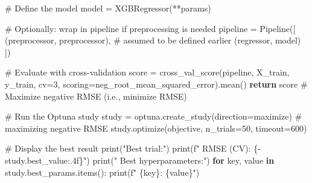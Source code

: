 \documentclass[
  letterpaper,
  DIV=11,
  numbers=noendperiod]{scrreprt}
\newenvironment{Shaded}{\begin{snugshade}}{\end{snugshade}}
\newcommand{\BuiltInTok}[1]{\textcolor[rgb]{0.00,0.23,0.31}{#1}}
\newcommand{\CommentTok}[1]{\textcolor[rgb]{0.37,0.37,0.37}{#1}}
\newcommand{\ControlFlowTok}[1]{\textcolor[rgb]{0.00,0.23,0.31}{\textbf{#1}}}
\newcommand{\DecValTok}[1]{\textcolor[rgb]{0.68,0.00,0.00}{#1}}
\newcommand{\KeywordTok}[1]{\textcolor[rgb]{0.00,0.23,0.31}{\textbf{#1}}}
\newcommand{\NormalTok}[1]{\textcolor[rgb]{0.00,0.23,0.31}{#1}}
\newcommand{\OperatorTok}[1]{\textcolor[rgb]{0.37,0.37,0.37}{#1}}
\newcommand{\SpecialCharTok}[1]{\textcolor[rgb]{0.37,0.37,0.37}{#1}}
\newcommand{\SpecialStringTok}[1]{\textcolor[rgb]{0.13,0.47,0.30}{#1}}
\newcommand{\StringTok}[1]{\textcolor[rgb]{0.13,0.47,0.30}{#1}}
\begin{document}
\begin{Shaded}
\begin{Highlighting}[]
    \CommentTok{\# Define the model}
\NormalTok{    model }\OperatorTok{=}\NormalTok{ XGBRegressor(}\OperatorTok{**}\NormalTok{params)}

    \CommentTok{\# Optionally: wrap in pipeline if preprocessing is needed}
\NormalTok{    pipeline }\OperatorTok{=}\NormalTok{ Pipeline([}
\NormalTok{        (}\StringTok{\textquotesingle{}preprocessor\textquotesingle{}}\NormalTok{, preprocessor),  }\CommentTok{\# assumed to be defined earlier}
\NormalTok{        (}\StringTok{\textquotesingle{}regressor\textquotesingle{}}\NormalTok{, model)}
\NormalTok{    ])}

    \CommentTok{\# Evaluate with cross{-}validation}
\NormalTok{    score }\OperatorTok{=}\NormalTok{ cross\_val\_score(pipeline, X\_train, y\_train, cv}\OperatorTok{=}\DecValTok{3}\NormalTok{, scoring}\OperatorTok{=}\StringTok{\textquotesingle{}neg\_root\_mean\_squared\_error\textquotesingle{}}\NormalTok{).mean()}
    \ControlFlowTok{return}\NormalTok{ score  }\CommentTok{\# Maximize negative RMSE (i.e., minimize RMSE)}

\CommentTok{\# Run the Optuna study}
\NormalTok{study }\OperatorTok{=}\NormalTok{ optuna.create\_study(direction}\OperatorTok{=}\StringTok{\textquotesingle{}maximize\textquotesingle{}}\NormalTok{)  }\CommentTok{\# maximizing negative RMSE}
\NormalTok{study.optimize(objective, n\_trials}\OperatorTok{=}\DecValTok{50}\NormalTok{, timeout}\OperatorTok{=}\DecValTok{600}\NormalTok{)}

\CommentTok{\# Display the best result}
\BuiltInTok{print}\NormalTok{(}\StringTok{"Best trial:"}\NormalTok{)}
\BuiltInTok{print}\NormalTok{(}\SpecialStringTok{f"  RMSE (CV): }\SpecialCharTok{\{}\OperatorTok{{-}}\NormalTok{study}\SpecialCharTok{.}\NormalTok{best\_value}\SpecialCharTok{:.4f\}}\SpecialStringTok{"}\NormalTok{)}
\BuiltInTok{print}\NormalTok{(}\StringTok{"  Best hyperparameters:"}\NormalTok{)}
\ControlFlowTok{for}\NormalTok{ key, value }\KeywordTok{in}\NormalTok{ study.best\_params.items():}
    \BuiltInTok{print}\NormalTok{(}\SpecialStringTok{f"    }\SpecialCharTok{\{}\NormalTok{key}\SpecialCharTok{\}}\SpecialStringTok{: }\SpecialCharTok{\{}\NormalTok{value}\SpecialCharTok{\}}\SpecialStringTok{"}\NormalTok{)}
\end{Highlighting}
\end{Shaded}
\end{document}
